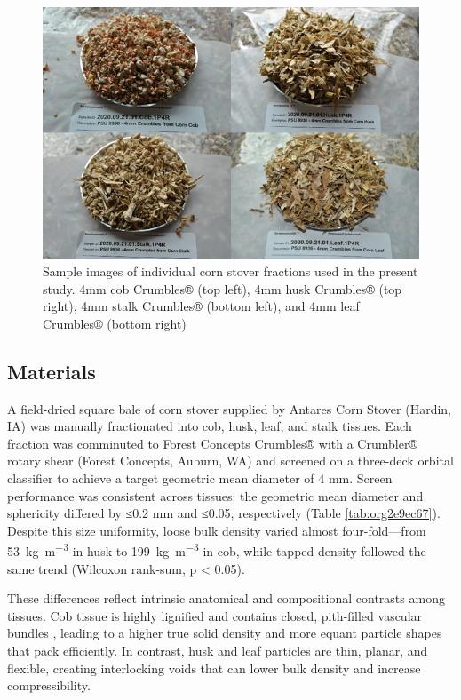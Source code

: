 \documentclass[xcolor=dvipsnames,10pt,hidelinks]{article}
\let\oldsubsection\subsection
\renewcommand{\subsection}{\clearpage\oldsubsection}
\begin{document}
\begin{figure}[htbp]
\centering
\includegraphics[width=.9\linewidth]{figures/image2.png}
\caption{\label{fig:orga50fe3d}Sample images of individual corn stover fractions used in the present study. 4mm cob Crumbles® (top left), 4mm husk Crumbles® (top right), 4mm stalk Crumbles® (bottom left), and 4mm leaf Crumbles® (bottom right)}
\end{figure}
\subsection{Materials}
\label{sec:org97375d2}
A field-dried square bale of corn stover supplied by Antares Corn Stover (Hardin, IA) was manually fractionated into cob, husk, leaf, and stalk tissues.
Each fraction was comminuted to Forest Concepts Crumbles® with a Crumbler® rotary shear (Forest Concepts, Auburn, WA) and
screened on a three-deck orbital classifier to achieve a target geometric mean diameter of 4 mm.
Screen performance was consistent across tissues:
the geometric mean diameter and sphericity differed by ≤0.2 mm and ≤0.05, respectively (Table \ref{tab:org2e9ec67}).
Despite this size uniformity, loose bulk density varied almost four-fold—from \qty{53}{\kilo\gram\per\cubic\meter} in husk
to \qty{199}{\kilo\gram\per\cubic\meter} in cob, while tapped density followed the same trend (Wilcoxon rank-sum, p < 0.05).

These differences reflect intrinsic anatomical and compositional contrasts among tissues.
Cob tissue is highly lignified \parencite{berchem_corn_2017} and contains closed, pith-filled vascular bundles \parencite{thornburg_mass_2022},
leading to a higher true solid density and more equant particle shapes that pack efficiently.
In contrast, husk and leaf particles are thin, planar, and flexible, creating interlocking voids \parencite{thornburg_mass_2022,li_characterization_2020} that
can lower bulk density and increase compressibility.
\end{document}
